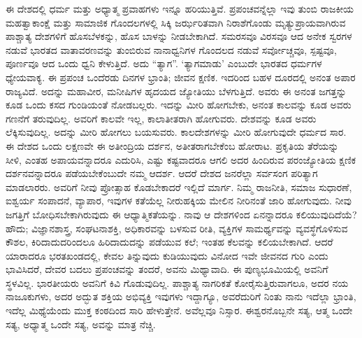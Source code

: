 ಈ ದೇಶದಲ್ಲಿ ಧರ್ಮ ಮತ್ತು ಅಧ್ಯಾತ್ಮ ಪ್ರವಾಹಗಳು ಇನ್ನೂ ಹರಿಯುತ್ತಿವೆ. ಪ್ರಪಂಚವನ್ನೆಲ್ಲಾ ಇವು ತುಂಬಿ ರಾಜಕೀಯ ಮಹತ್ವಾಕಾಂಕ್ಷೆ ಮತ್ತು ಸಾಮಾಜಿಕ ಗೊಂದಲಗಳಲ್ಲಿ ಸಿಕ್ಕಿ ಜರ್ಝರಿತವಾಗಿ ನಿರಾಶೆಗೊಂಡು ಮೃತ್ಯುಪ್ರಾಯವಾಗಿರುವ ಪಾಶ್ಚಾತ್ಯ ದೇಶಗಳಿಗೆ ಹೊಸಬೆಳಕನ್ನು, ಹೊಸ ಬಾಳನ್ನು ನೀಡಬೇಕಾಗಿದೆ. ಸಮರಸವೂ ವಿರಸವೂ ಆದ ಅನೇಕ ಸ್ವರಗಳ ನಡುವೆ ಭಾರತದ ವಾತಾವರಣವನ್ನು ತುಂಬಿರುವ ನಾನಾಧ್ವನಿಗಳ ಗೊಂದಲದ ನಡುವೆ ಸರ್ವೋಚ್ಚವೂ, ಸ್ಪಷ್ಟವೂ, ಪೂರ್ಣವೂ ಆದ ಒಂದು ಧ್ವನಿ ಕೇಳುತ್ತಿದೆ. ಅದು “ತ್ಯಾಗ”. ‘ತ್ಯಾಗಮಾಡು’ ಎಂಬುದೇ ಭಾರತದ ಧರ್ಮಗಳ ಧ್ಯೇಯವಾಕ್ಯ. ಈ ಪ್ರಪಂಚ ಒಂದೆರಡು ದಿನಗಳ ಭ್ರಾಂತಿ; ಜೀವನ ಕ್ಷಣಿಕ. ಇದರಿಂದ ಬಹಳ ದೂರದಲ್ಲಿ ಅನಂತ ಅಪಾರ ರಾಜ್ಯವಿದೆ. ಅದನ್ನು ಮಹಾವೀರ, ಮನೀಷಿಗಳ ಹೃದಯದ ಜ್ಯೋತಿಯು ಬೆಳಗುತ್ತಿದೆ. ಅವರು ಈ ಅನಂತ ಜಗತ್ತನ್ನು ಕೂಡ ಒಂದು ಕಸದ ಗುಂಡಿಯಂತೆ ನೋಡಬಲ್ಲರು. ಇದನ್ನು ಮೀರಿ ಹೋಗಬೇಕು, ಅನಂತ ಕಾಲವನ್ನು ಕೂಡ ಅವರು ಗಣನೆಗೆ ತರುವುದಿಲ್ಲ. ಅವರಿಗೆ ಕಾಲವೇ ಇಲ್ಲ, ಕಾಲಾತೀತರಾಗಿ ಹೋಗುವರು. ದೇಶವನ್ನು ಕೂಡ ಅವರು ಲೆಕ್ಕಿಸುವುದಿಲ್ಲ. ಅದನ್ನು ಮೀರಿ ಹೋಗಲು ಬಯಸುವರು. ಕಾಲದೇಶಗಳನ್ನು ಮೀರಿ ಹೋಗುವುದೇ ಧರ್ಮದ ಸಾರ. ಈ ದೇಶದ ಒಂದು ಲಕ್ಷಣವೇ ಈ ಅತೀಂದ್ರಿಯ ದರ್ಶನ, ಅತೀತರಾಗಬೇಕೆಂಬ ಹೋರಾಟ. ಪ್ರಕೃತಿಯ ತೆರೆಯನ್ನು ಸೀಳಿ, ಎಂತಹ ಅಪಾಯವನ್ನಾದರೂ ಎದುರಿಸಿ, ಎಷ್ಟು ಕಷ್ಟವಾದರೂ ಆಗಲಿ ಅದರ ಹಿಂದಿರುವ ಪರಂಜ್ಯೋತಿಯ ಕ್ಷಣಿಕ ದರ್ಶನವನ್ನಾದರೂ ಪಡೆಯಬೇಕೆಂಬುದೇ ನಮ್ಮ ಆದರ್ಶ. ಆದರೆ ದೇಶದ ಜನರೆಲ್ಲಾ ಸರ್ವಸಂಗ ಪರಿತ್ಯಾಗ ಮಾಡಲಾರರು. ಅವರಿಗೆ ನೀವು ಪ್ರೋತ್ಸಾಹ ಕೊಡಬೇಕಾದರೆ ಇಲ್ಲಿದೆ ಮಾರ್ಗ. ನಿಮ್ಮ ರಾಜನೀತಿ, ಸಮಾಜ ಸುಧಾರಣೆ, ಐಶ್ವರ್ಯ ಸಂಪಾದನೆ, ವ್ಯಾಪಾರ, ಇವುಗಳ ಕತೆಯೆಲ್ಲ ನೀರುಹಕ್ಕಿಯ ಮೇಲಿನ ನೀರಿನಂತೆ ಜಾರಿ ಹೋಗುವುದು. ನೀವು ಜಗತ್ತಿಗೆ ಬೋಧಿಸಬೇಕಾಗಿರುವುದು ಈ ಆಧ್ಯಾತ್ಮಿಕತೆಯನ್ನು. ನಾವು ಆ ದೇಶಗಳಿಂದ ಏನನ್ನಾದರೂ ಕಲಿಯುವುದಿದೆಯೆ? ಹೌದು; ವಿಜ್ಞಾನಶಾಸ್ತ್ರ, ಸಂಘಟನಾಶಕ್ತಿ, ಅಧಿಕಾರವನ್ನು ಬಳಸುವ ರೀತಿ, ವ್ಯಕ್ತಿಗಳ ಸಾಮರ್ಥ್ಯವನ್ನು ವ್ಯವಸ್ಥೆಗೊಳಿಸುವ ಕೌಶಲ, ಕಿರಿದಾದುದರಿಂದಲೂ ಹಿರಿದಾದುದನ್ನು ಪಡೆಯುವ ಕಲೆ; ಇಂತಹ ಕೆಲವನ್ನು ಕಲಿಯಬೇಕಾಗಿದೆ. ಆದರೆ ಯಾರಾದರೂ ಭರತಖಂಡದಲ್ಲಿ, ಕೇವಲ ತಿನ್ನುವುದು ಕುಡಿಯುವುದು ವಿನೋದ ಇವೇ ಜೀವನದ ಗುರಿ ಎಂದು ಭಾವಿಸಿದರೆ, ದೇವರ ಬದಲು ಪ್ರಪಂಚವನ್ನು ತಂದರೆ, ಅವನು ಮಿಥ್ಯಾವಾದಿ. ಈ ಪುಣ್ಯಭೂಮಿಯಲ್ಲಿ ಅವನಿಗೆ ಸ್ಥಳವಿಲ್ಲ. ಭಾರತೀಯರು ಅವನಿಗೆ ಕಿವಿ ಗೊಡುವುದಿಲ್ಲ. ಪಾಶ್ಚಾತ್ಯ ನಾಗರಿಕತೆ ಕೋರೈಸುತ್ತಿರುವಾಗಲೂ, ಅದರ ನಯ ನಾಜೂಕುಗಳು, ಅದರ ಅದ್ಭುತ ಶಕ್ತಿಯ ಅಭಿವ್ಯಕ್ತಿ ಇವುಗಳು ಇದ್ದಾಗ್ಯೂ, ಅವರೆದುರಿಗೆ ನಿಂತು ನಾನು ಇದೆಲ್ಲಾ ಭ್ರಾಂತಿ, ಇದೆಲ್ಲ ಮಿಥ್ಯೆಯೆಂದು ಮುಕ್ತ ಕಂಠದಿಂದ ಸಾರಿ ಹೇಳುತ್ತೇನೆ. ಅವೆಲ್ಲವೂ ನಿಸ್ಸಾರ. ಈಶ್ವರನೊಬ್ಬನೇ ಸತ್ಯ, ಆತ್ಮ ಒಂದೇ ಸತ್ಯ, ಅಧ್ಯಾತ್ಮ ಒಂದೇ ಸತ್ಯ, ಅವನ್ನು ಮಾತ್ರ ನೆಚ್ಚಿ. 

